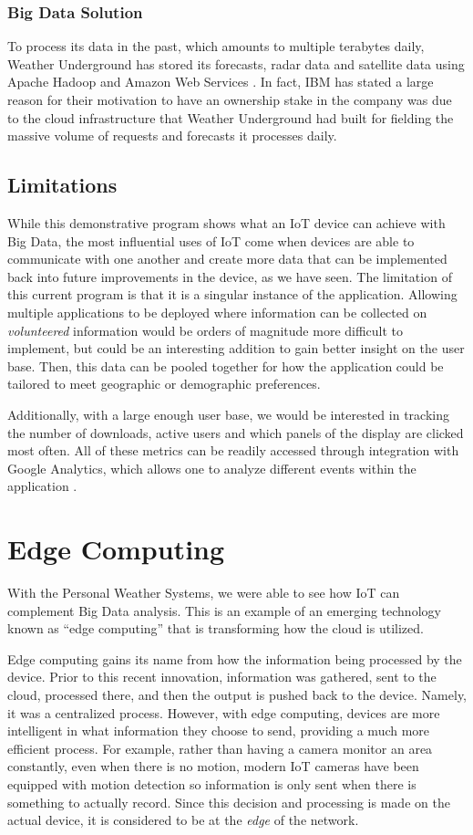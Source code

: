 \documentclass[sigconf]{acmart}
\begin{document}
\subsubsection{Big Data Solution}
To process its data in the past, which amounts to multiple terabytes daily, Weather Underground has stored its forecasts, radar data and satellite data using Apache Hadoop and Amazon Web Services \cite{wuinf}. In fact, IBM has stated a large reason for their motivation to have an ownership stake in the company was due to the cloud infrastructure that Weather Underground had built for fielding the massive volume of requests and forecasts it processes daily.  

\subsection{Limitations}

While this demonstrative program shows what an IoT device can achieve with Big Data, the most influential uses of IoT come when devices are able to communicate with one another and create more data that can be implemented back into future improvements in the device, as we have seen. The limitation of this current program is that it is a singular instance of the application. Allowing multiple applications to be deployed where information can be collected on \emph{volunteered} information would be orders of magnitude more difficult to implement, but could be an interesting addition to gain better insight on the user base. Then, this data can be pooled together for how the application could be tailored to meet geographic or demographic preferences.

Additionally, with a large enough user base, we would be interested in tracking the number of downloads, active users and which panels of the display are clicked most often. All of these metrics can be readily accessed through integration with Google Analytics, which allows one to analyze different events within the application \cite{googleanalytics}.

\section{Edge Computing}
With the Personal Weather Systems, we were able to see how IoT can complement Big Data analysis. This is an example of an emerging technology known as ``edge computing'' that is transforming how the cloud is utilized. 

Edge computing gains its name from how the information being processed by the device.  Prior to this recent innovation, information was gathered, sent to the cloud, processed there, and then the output is pushed back to the device. Namely, it was a centralized process. However, with edge computing, devices are more intelligent in what information they choose to send, providing a much more efficient process. For example, rather than having a camera monitor an area constantly, even when there is no motion, modern IoT cameras have been equipped with motion detection so information is only sent when there is something to actually record. Since this decision and processing is made on the actual device, it is considered to be at the \emph{edge} of the network.
\end{document}
